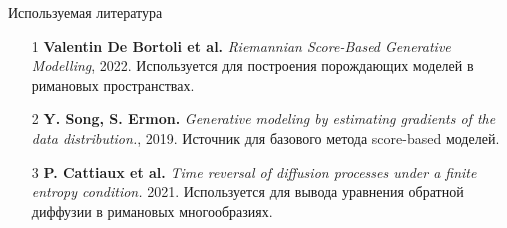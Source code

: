 \documentclass{beamer}
\begin{document}
\begin{frame}{Используемая литература}

\begin{itemize}
    \item [1] \textbf{Valentin De Bortoli et al.}  
    \emph{Riemannian Score-Based Generative Modelling}, 2022.  
    Используется для построения порождающих моделей в римановых пространствах.  

    \item [2] \textbf{Y. Song, S. Ermon.}  
    \emph{Generative modeling by estimating gradients of the data distribution.}, 2019.  
    Источник для базового метода score-based моделей.

    \item [3] \textbf{P. Cattiaux et al.}  
    \emph{Time reversal of diffusion processes under a finite entropy condition.} 2021.  
    Используется для вывода уравнения обратной диффузии в римановых многообразиях.
\end{itemize}

\end{frame}





\end{document}
